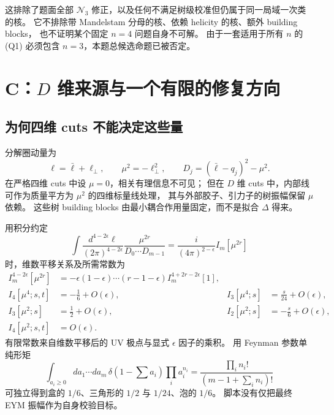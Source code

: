 \documentclass[UTF8,a4paper,11pt,fontset=fandol]{ctexart}
\begin{document}
这排除了题面全部 $\mathcal N_3$ 修正，以及任何不满足树级校准但仍属于同一局域一次类的核。
它不排除带 Mandelstam 分母的核、依赖 helicity 的核、额外 building blocks，
也不证明某个固定 $n=4$ 问题自身不可解。
由于一套适用于所有 $n$ 的 (Q1) 必须包含 $n=3$，本题总候选命题已被否定。

\section{C：\texorpdfstring{$D$}{D} 维来源与一个有限的修复方向}\label{sec:mu}

\subsection{为何四维 cuts 不能决定这些量}
分解圈动量为
\begin{equation}
 \ell=\bar\ell+\ell_\perp,\qquad
 \mu^2=-\ell_\perp^2,\qquad
 D_j=(\bar\ell-q_j)^2-\mu^2.
\end{equation}
在严格四维 cuts 中设 $\mu=0$，相关有理信息不可见；
但在 $D$ 维 cuts 中，内部线可作为质量平方为 $\mu^2$ 的四维标量线处理，
其与外部胶子、引力子的树振幅保留 $\mu$ 依赖。
这些树 building blocks 由最小耦合作用量固定，而不是拟合 $\Delta$ 得来。

用积分约定
\begin{equation}
 \int\frac{d^{4-2\epsilon}\ell}{(2\pi)^{4-2\epsilon}}
 \frac{\mu^{2r}}{D_0\cdots D_{m-1}}
 =\frac{i}{(4\pi)^{2-\epsilon}}I_m[\mu^{2r}]
\end{equation}
时，维数平移关系及所需常数为\cite{NPT}
\begin{align}
 I_m^{4-2\epsilon}[\mu^{2r}]&=
 -\epsilon(1-\epsilon)\cdots(r-1-\epsilon)I_m^{4+2r-2\epsilon}[1],\\
 I_4[\mu^4;s,t]&=-\frac16+O(\epsilon),&
 I_3[\mu^4;s]&=\frac{s}{24}+O(\epsilon),\\
 I_3[\mu^2;s]&=\frac12+O(\epsilon),&
 I_2[\mu^2;s]&=-\frac{s}{6}+O(\epsilon),\\
 I_4[\mu^2;s,t]&=O(\epsilon).
\label{eq:integrals}
\end{align}
有限常数来自维数平移后的 UV 极点与显式 $\epsilon$ 因子的乘积。
用 Feynman 参数单纯形矩
\begin{equation}
 \int_{a_i\ge0}da_1\cdots da_m\,
 \delta(1-\textstyle\sum a_i)\prod_i a_i^{n_i}
 =\frac{\prod_i n_i!}{(m-1+\sum_i n_i)!}
\end{equation}
可独立得到盒的 $1/6$、三角形的 $1/2$ 与 $1/24$、泡的 $1/6$。
脚本没有仅把最终 EYM 振幅作为自身校验目标。
\end{document}
